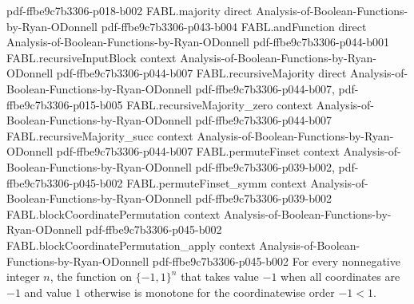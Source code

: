 \begin{theorem}
  {pdf-ffbe9c7b3306-p018-b002}
\proofstep
  {FABL.majority}
  {direct}
  {Analysis-of-Boolean-Functions-by-Ryan-ODonnell}
  {pdf-ffbe9c7b3306-p043-b004}
\proofstep
  {FABL.andFunction}
  {direct}
  {Analysis-of-Boolean-Functions-by-Ryan-ODonnell}
  {pdf-ffbe9c7b3306-p044-b001}
\proofstep
  {FABL.recursiveInputBlock}
  {context}
  {Analysis-of-Boolean-Functions-by-Ryan-ODonnell}
  {pdf-ffbe9c7b3306-p044-b007}
\proofstep
  {FABL.recursiveMajority}
  {direct}
  {Analysis-of-Boolean-Functions-by-Ryan-ODonnell}
  {pdf-ffbe9c7b3306-p044-b007,
    pdf-ffbe9c7b3306-p015-b005}
\proofstep
  {FABL.recursiveMajority_zero}
  {context}
  {Analysis-of-Boolean-Functions-by-Ryan-ODonnell}
  {pdf-ffbe9c7b3306-p044-b007}
\proofstep
  {FABL.recursiveMajority_succ}
  {context}
  {Analysis-of-Boolean-Functions-by-Ryan-ODonnell}
  {pdf-ffbe9c7b3306-p044-b007}
\proofstep
  {FABL.permuteFinset}
  {context}
  {Analysis-of-Boolean-Functions-by-Ryan-ODonnell}
  {pdf-ffbe9c7b3306-p039-b002,
    pdf-ffbe9c7b3306-p045-b002}
\proofstep
  {FABL.permuteFinset_symm}
  {context}
  {Analysis-of-Boolean-Functions-by-Ryan-ODonnell}
  {pdf-ffbe9c7b3306-p039-b002}
\proofstep
  {FABL.blockCoordinatePermutation}
  {context}
  {Analysis-of-Boolean-Functions-by-Ryan-ODonnell}
  {pdf-ffbe9c7b3306-p045-b002}
\proofstep
  {FABL.blockCoordinatePermutation_apply}
  {context}
  {Analysis-of-Boolean-Functions-by-Ryan-ODonnell}
  {pdf-ffbe9c7b3306-p045-b002}
For every nonnegative integer $n$, the function on $\{-1,1\}^n$ that takes value $-1$
when all coordinates are $-1$ and value $1$ otherwise is monotone for the coordinatewise
order $-1<1$.
\end{theorem}

